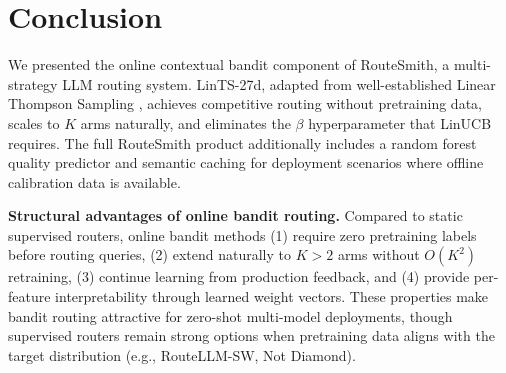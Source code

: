 \section{Conclusion}
\label{sec:conclusion}

We presented the online contextual bandit component of RouteSmith, a multi-strategy LLM routing system. LinTS-27d, adapted from well-established Linear Thompson Sampling \citep{abeille2017linear}, achieves competitive routing without pretraining data, scales to $K$ arms naturally, and eliminates the $\beta$ hyperparameter that LinUCB requires. The full RouteSmith product additionally includes a random forest quality predictor and semantic caching for deployment scenarios where offline calibration data is available.

\textbf{Structural advantages of online bandit routing.} Compared to static supervised routers, online bandit methods (1) require zero pretraining labels before routing queries, (2) extend naturally to $K > 2$ arms without $O(K^2)$ retraining, (3) continue learning from production feedback, and (4) provide per-feature interpretability through learned weight vectors. These properties make bandit routing attractive for zero-shot multi-model deployments, though supervised routers remain strong options when pretraining data aligns with the target distribution (e.g., RouteLLM-SW, Not Diamond).

